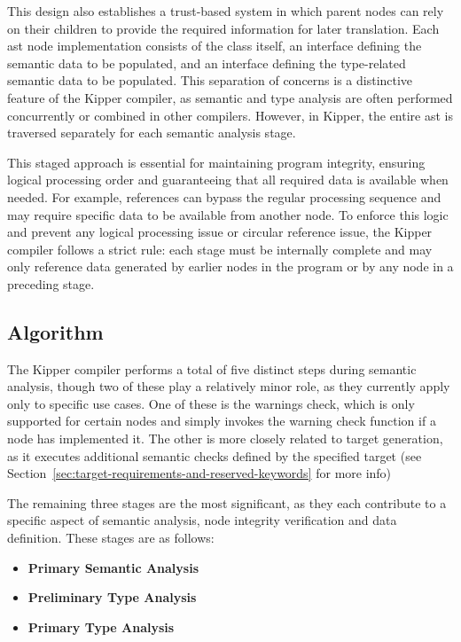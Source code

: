 This design also establishes a trust-based system in which parent nodes can rely on their children to provide the required information for later translation. Each \acrshort{ast} node implementation consists of the class itself, an interface defining the semantic data to be populated, and an interface defining the type-related semantic data to be populated. This separation of concerns is a distinctive feature of the Kipper compiler, as semantic and type analysis are often performed concurrently or combined in other compilers. However, in Kipper, the entire \acrshort{ast} is traversed separately for each semantic analysis stage.

This staged approach is essential for maintaining program integrity, ensuring logical processing order and guaranteeing that all required data is available when needed. For example, references can bypass the regular processing sequence and may require specific data to be available from another node. To enforce this logic and prevent any logical processing issue or circular reference issue, the Kipper compiler follows a strict rule: each stage must be internally complete and may only reference data generated by earlier nodes in the program or by any node in a preceding stage.

\subsection{Algorithm}

The Kipper compiler performs a total of five distinct steps during semantic analysis, though two of these play a relatively minor role, as they currently apply only to specific use cases. One of these is the warnings check, which is only supported for certain nodes and simply invokes the warning check function if a node has implemented it. The other is more closely related to target generation, as it executes additional semantic checks defined by the specified target (see Section~\ref{sec:target-requirements-and-reserved-keywords} for more info)

The remaining three stages are the most significant, as they each contribute to a specific aspect of semantic analysis, node integrity verification and data definition. These stages are as follows:

\begin{itemize}
	\item \textbf{Primary Semantic Analysis}
	\item \textbf{Preliminary Type Analysis}
	\item \textbf{Primary Type Analysis}
\end{itemize}

